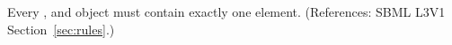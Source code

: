 Every \AssignmentRule, \RateRule and \AlgebraicRule object must contain
exactly one  element.  (References: SBML
L3V1 Section~\ref{sec:rules}.)

